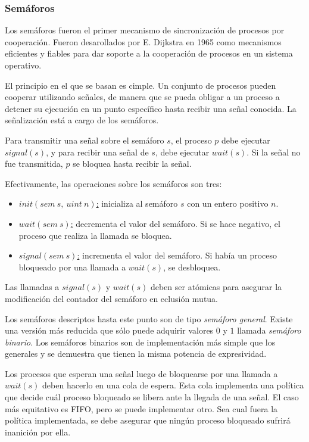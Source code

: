 \subsubsection{Semáforos}
\label{semaforos}

Los semáforos fueron el primer mecanismo de sincronización de procesos por
cooperación. Fueron desarollados por E. Dijkstra en 1965 como mecanismos
eficientes y fiables para dar soporte a la cooperación de procesos en un sistema
operativo.

El principio en el que se basan es cimple. Un conjunto de procesos pueden
cooperar utilizando señales, de manera que se pueda obligar a un proceso a
detener su ejecución en un punto específico hasta recibir una señal conocida.
La señalización está a cargo de los semáforos.

Para transmitir una señal sobre el semáforo $s$, el proceso $p$ debe ejecutar
$signal(s)$, y para recibir una señal de $s$, debe ejecutar $wait(s)$. Si la
señal no fue transmitida, $p$ se bloquea hasta recibir la señal.

Efectivamente, las operaciones sobre los semáforos son tres:
\begin{itemize}
    \item \underline{$init(sem\ s,\ uint\ n)$:} inicializa al semáforo $s$ con
    un entero positivo $n$.
    \item \underline{$wait(sem\ s)$:} decrementa el valor del semáforo. Si se
    hace negativo, el proceso que realiza la llamada se bloquea.
    \item \underline{$signal(sem\ s)$:} incrementa el valor del semáforo. Si
    había un proceso bloqueado por una llamada a $wait(s)$, se desbloquea.
\end{itemize}

Las llamadas a $signal(s)$ y $wait(s)$ deben ser atómicas para asegurar la
modificación del contador del semáforo en eclusión mutua.

Los semáforos descriptos hasta este punto son de tipo \textit{semáforo
general}.
Existe una versión más reducida que sólo puede adquirir valores $0$ y $1$ llamada
\textit{semáforo binario}. Los semáforos binarios son de implementación más
simple que los generales y se demuestra que tienen la misma potencia de
expresividad. \cite{SistOpStallings}

Los procesos que esperan una señal luego de bloquearse por una llamada a
$wait(s)$ deben hacerlo en una cola de espera. Esta cola implementa una política
que decide cuál proceso bloqueado se libera ante la llegada de una señal. El
caso más equitativo es FIFO, pero se puede implementar otro. Sea cual fuera la
política implementada, se debe asegurar que ningún proceso bloqueado sufrirá
inanición por ella.

